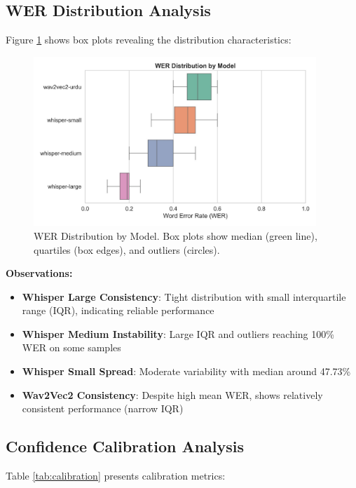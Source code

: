 \subsection{WER Distribution Analysis}

Figure \ref{fig:wer_distribution} shows box plots revealing the distribution characteristics:

\begin{figure}[H]
    \centering
    \includegraphics[width=0.95\textwidth]{ThesisFigs/wer_distribution.jpg}
    \caption{WER Distribution by Model. Box plots show median (green line), quartiles (box edges), and outliers (circles).}
    \label{fig:wer_distribution}
\end{figure}

\textbf{Observations:}

\begin{itemize}
    \item \textbf{Whisper Large Consistency}: Tight distribution with small interquartile range (IQR), indicating reliable performance
    \item \textbf{Whisper Medium Instability}: Large IQR and outliers reaching 100\% WER on some samples
    \item \textbf{Whisper Small Spread}: Moderate variability with median around 47.73\%
    \item \textbf{Wav2Vec2 Consistency}: Despite high mean WER, shows relatively consistent performance (narrow IQR)
\end{itemize}

\subsection{Confidence Calibration Analysis}

Table \ref{tab:calibration} presents calibration metrics:

